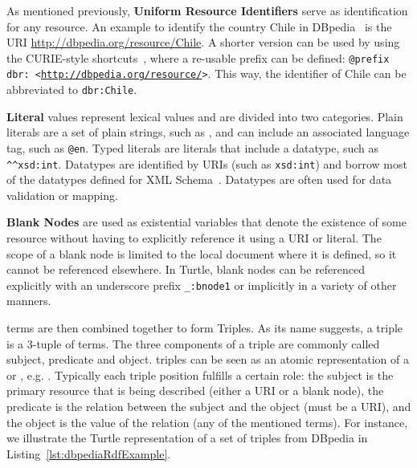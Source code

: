 As mentioned previously, \textbf{Uniform Resource Identifiers} serve as identification for 
any resource. An example to identify the country Chile in DBpedia~\cite{KG:dbpedia} is 
the URI \url{http://dbpedia.org/resource/Chile}. A shorter version can be used 
by using the CURIE-style shortcuts~\cite{key:prefixes}, where a re-usable prefix can be 
defined: \texttt{@prefix dbr: <\url{http://dbpedia.org/resource/}>}. This way, the 
identifier of Chile can be abbreviated to \texttt{dbr:Chile}.

\textbf{Literal} values represent lexical values and are divided into two categories. 
Plain literals are a set of plain strings, such as \texttt{}, and can 
include an associated language tag, such as \texttt{@en}. Typed 
literals are literals that include a datatype, such as 
\texttt{\textasciicircum\textasciicircum xsd:int}. Datatypes are identified by 
URIs (such as \texttt{xsd:int}) and borrow most of the datatypes defined for XML 
Schema~\cite{key:xsd}. Datatypes are often used for data validation or mapping.

\textbf{Blank Nodes} are used as existential variables that denote the existence of some 
resource without having to explicitly reference it using a URI or literal. The scope of a 
blank node is limited to the local \RDF{} document where it is defined, so it cannot be 
referenced elsewhere. In Turtle, blank nodes can be referenced explicitly with an 
underscore prefix \texttt{\_:bnode1} or implicitly in a variety of other manners.

\RDF{} terms are then combined together to form \RDF{} Triples. As its name suggests, a triple 
is a 3-tuple of \RDF{} terms. The three components of a triple are commonly called subject, 
predicate and object. \RDF{} triples can be seen as an atomic representation of a 
 or , e.g. . 
Typically each \RDF{} triple position fulfills a certain role: the subject is the primary 
resource that is being described (either a URI or a blank node), the predicate is the 
relation between the subject and the object (must be a URI), and the object is the value 
of the relation (any of the mentioned \RDF{} terms). For instance, we illustrate the Turtle 
representation of a set of \RDF{} triples from DBpedia in Listing~\ref{lst:dbpediaRdfExample}.

